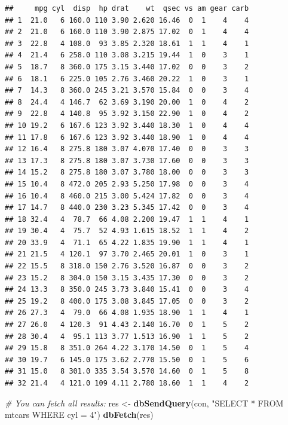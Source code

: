 \documentclass[]{book}
\newenvironment{Shaded}{\begin{snugshade}}{\end{snugshade}}
\newcommand{\KeywordTok}[1]{\textcolor[rgb]{0.13,0.29,0.53}{\textbf{#1}}}
\newcommand{\StringTok}[1]{\textcolor[rgb]{0.31,0.60,0.02}{#1}}
\newcommand{\CommentTok}[1]{\textcolor[rgb]{0.56,0.35,0.01}{\textit{#1}}}
\newcommand{\NormalTok}[1]{#1}
\begin{document}
\begin{verbatim}
##     mpg cyl  disp  hp drat    wt  qsec vs am gear carb
## 1  21.0   6 160.0 110 3.90 2.620 16.46  0  1    4    4
## 2  21.0   6 160.0 110 3.90 2.875 17.02  0  1    4    4
## 3  22.8   4 108.0  93 3.85 2.320 18.61  1  1    4    1
## 4  21.4   6 258.0 110 3.08 3.215 19.44  1  0    3    1
## 5  18.7   8 360.0 175 3.15 3.440 17.02  0  0    3    2
## 6  18.1   6 225.0 105 2.76 3.460 20.22  1  0    3    1
## 7  14.3   8 360.0 245 3.21 3.570 15.84  0  0    3    4
## 8  24.4   4 146.7  62 3.69 3.190 20.00  1  0    4    2
## 9  22.8   4 140.8  95 3.92 3.150 22.90  1  0    4    2
## 10 19.2   6 167.6 123 3.92 3.440 18.30  1  0    4    4
## 11 17.8   6 167.6 123 3.92 3.440 18.90  1  0    4    4
## 12 16.4   8 275.8 180 3.07 4.070 17.40  0  0    3    3
## 13 17.3   8 275.8 180 3.07 3.730 17.60  0  0    3    3
## 14 15.2   8 275.8 180 3.07 3.780 18.00  0  0    3    3
## 15 10.4   8 472.0 205 2.93 5.250 17.98  0  0    3    4
## 16 10.4   8 460.0 215 3.00 5.424 17.82  0  0    3    4
## 17 14.7   8 440.0 230 3.23 5.345 17.42  0  0    3    4
## 18 32.4   4  78.7  66 4.08 2.200 19.47  1  1    4    1
## 19 30.4   4  75.7  52 4.93 1.615 18.52  1  1    4    2
## 20 33.9   4  71.1  65 4.22 1.835 19.90  1  1    4    1
## 21 21.5   4 120.1  97 3.70 2.465 20.01  1  0    3    1
## 22 15.5   8 318.0 150 2.76 3.520 16.87  0  0    3    2
## 23 15.2   8 304.0 150 3.15 3.435 17.30  0  0    3    2
## 24 13.3   8 350.0 245 3.73 3.840 15.41  0  0    3    4
## 25 19.2   8 400.0 175 3.08 3.845 17.05  0  0    3    2
## 26 27.3   4  79.0  66 4.08 1.935 18.90  1  1    4    1
## 27 26.0   4 120.3  91 4.43 2.140 16.70  0  1    5    2
## 28 30.4   4  95.1 113 3.77 1.513 16.90  1  1    5    2
## 29 15.8   8 351.0 264 4.22 3.170 14.50  0  1    5    4
## 30 19.7   6 145.0 175 3.62 2.770 15.50  0  1    5    6
## 31 15.0   8 301.0 335 3.54 3.570 14.60  0  1    5    8
## 32 21.4   4 121.0 109 4.11 2.780 18.60  1  1    4    2
\end{verbatim}

\begin{Shaded}
\begin{Highlighting}[]
\CommentTok{# You can fetch all results:}
\NormalTok{res <-}\StringTok{ }\KeywordTok{dbSendQuery}\NormalTok{(con, }\StringTok{"SELECT * FROM mtcars WHERE cyl = 4"}\NormalTok{)}
\KeywordTok{dbFetch}\NormalTok{(res)}
\end{Highlighting}
\end{Shaded}
\end{document}

